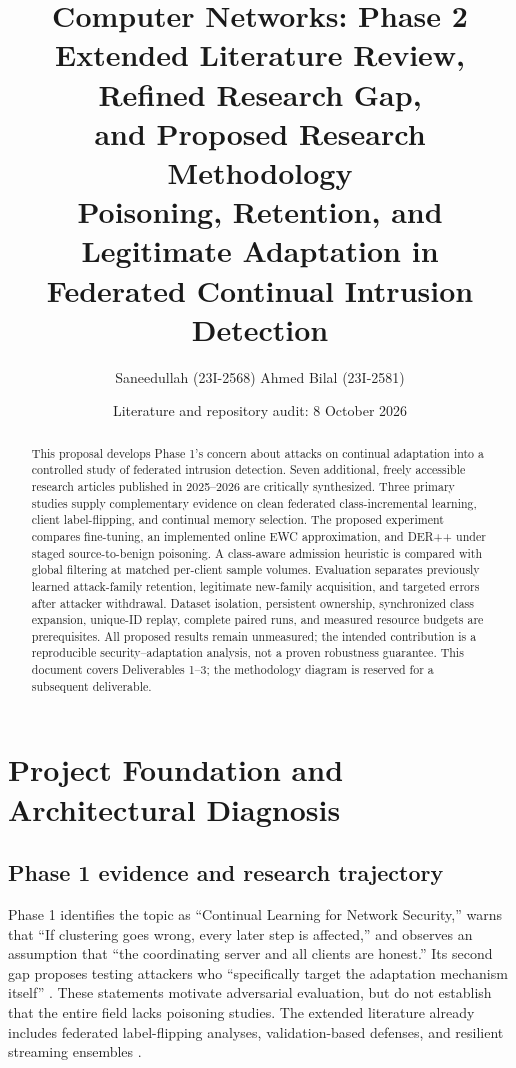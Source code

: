 \documentclass[10pt,a4paper]{article}
\title{\textbf{Computer Networks: Phase 2}\\[5pt]
Extended Literature Review, Refined Research Gap,\\
and Proposed Research Methodology\\[7pt]
\large Poisoning, Retention, and Legitimate Adaptation in\\
Federated Continual Intrusion Detection}
\author{Saneedullah (23I-2568) \qquad Ahmed Bilal (23I-2581)}
\date{Literature and repository audit: 8 October 2026}
\begin{document}
\maketitle
\begin{abstract}
This proposal develops Phase 1's concern about attacks on continual adaptation into a controlled study of federated intrusion detection. Seven additional, freely accessible research articles published in 2025--2026 are critically synthesized. Three primary studies supply complementary evidence on clean federated class-incremental learning, client label-flipping, and continual memory selection. The proposed experiment compares fine-tuning, an implemented online EWC approximation, and DER++ under staged source-to-benign poisoning. A class-aware admission heuristic is compared with global filtering at matched per-client sample volumes. Evaluation separates previously learned attack-family retention, legitimate new-family acquisition, and targeted errors after attacker withdrawal. Dataset isolation, persistent ownership, synchronized class expansion, unique-ID replay, complete paired runs, and measured resource budgets are prerequisites. All proposed results remain unmeasured; the intended contribution is a reproducible security--adaptation analysis, not a proven robustness guarantee. This document covers Deliverables 1--3; the methodology diagram is reserved for a subsequent deliverable.
\end{abstract}
\tableofcontents
\newpage

\section{Project Foundation and Architectural Diagnosis}
\subsection{Phase 1 evidence and research trajectory}
Phase 1 identifies the topic as ``Continual Learning for Network Security,'' warns that ``If clustering goes wrong, every later step is affected,'' and observes an assumption that ``the coordinating server and all clients are honest.'' Its second gap proposes testing attackers who ``specifically target the adaptation mechanism itself'' \cite{phase1}. These statements motivate adversarial evaluation, but do not establish that the entire field lacks poisoning studies. The extended literature already includes federated label-flipping analyses, validation-based defenses, and resilient streaming ensembles \cite{lavaur,wei,ensemble}.
\end{document}
